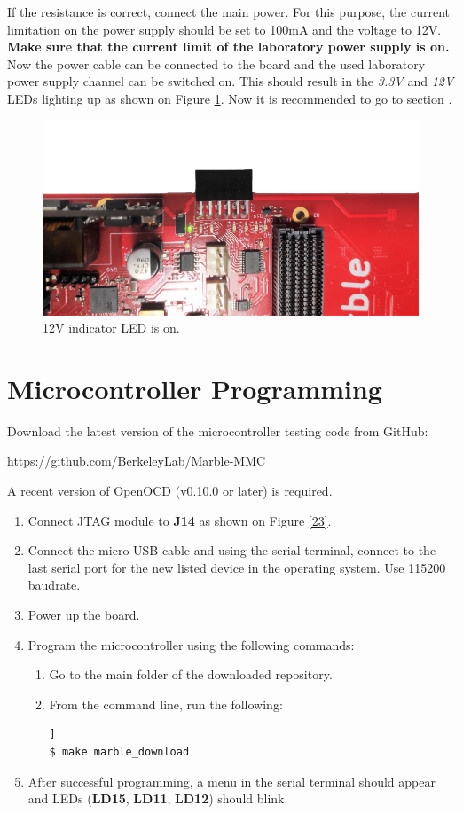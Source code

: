 \documentclass[12pt,oneside,a4]{article}
\begin{document}
If the resistance is correct, connect the main power. For this purpose, the current limitation on the power supply should be set to 100mA and the voltage to 12V. \textbf{Make sure that the current limit of the laboratory power supply is on.} Now the power cable can be connected to the board and the used laboratory power supply channel can be switched on.
This should result in the \textit{3.3V} and \textit{12V} LEDs lighting up as shown  on Figure \ref{02}. Now it is recommended to go to section .
\begin{figure}[H]
\begin{center}
\includegraphics[width=0.8\linewidth, angle = 180]{xrpoff.png}
 \caption{12V indicator LED is on. }\label{02}
\end{center}
\end{figure}

\section{Microcontroller Programming}
\label{microcontroller}

Download the latest version of the microcontroller testing code from GitHub:
\begin{leftbar}
https://github.com/BerkeleyLab/Marble-MMC
\end{leftbar}

A recent version of OpenOCD (v0.10.0 or later) is required.
\begin{enumerate}
	\item Connect JTAG module to \textbf{J14} as shown on Figure \ref{23}.
	\item Connect the micro USB cable and using the serial terminal, connect to the last serial port for the new listed device in the operating system. Use 115200 baudrate.
	\item Power up the board.
	\item Program the microcontroller using the following commands:
	\begin{enumerate}
	\item Go to the main folder of the downloaded repository.
	\item From the command line, run the following:
	\begin{lstlisting}[backgroundcolor = \color{Gainsboro}, language=bash, frame=none]]
$ make marble_download
	\end{lstlisting}
	\end{enumerate}
\item After successful programming, a menu in the serial terminal should appear and LEDs (\textbf{LD15}, \textbf{LD11}, \textbf{LD12}) should blink.
\end{enumerate}
\end{document}
